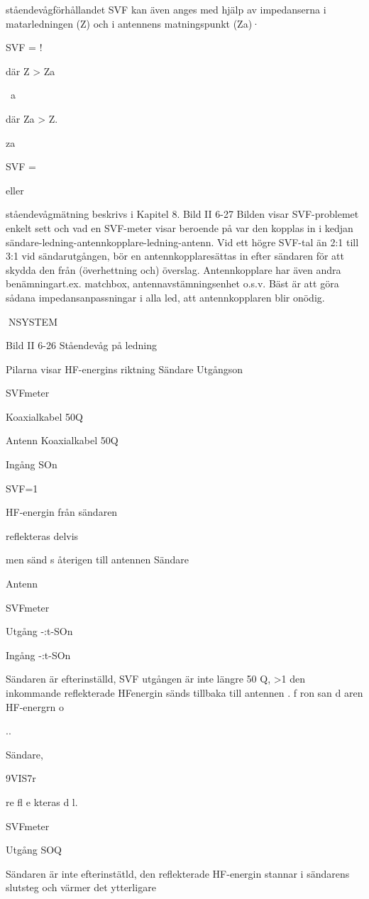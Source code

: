 {{ståendevågförhållandet SVF kan även
anges med hjälp av impedanserna i matarledningen (Z) och i antennens matningspunkt (Za)·

SVF = !

där Z > Za

~a

där Za > Z.

za

SVF =

eller

ståendevågmätning beskrivs i Kapitel 8.
Bild II 6-27
Bilden visar SVF-problemet enkelt sett
och vad en SVF-meter visar beroende på
var den kopplas in i kedjan sändare-ledning-antennkopplare-ledning-antenn.
Vid ett högre SVF-tal än 2:1 till 3:1 vid
sändarutgången, bör en antennkopplaresättas in efter sändaren för att skydda den från
(överhettning och) överslag. Antennkopplare har även andra benämningart.ex. matchbox, antennavstämningsenhet o.s.v. Bäst
är att göra sådana impedansanpassningar i
alla led, att antennkopplaren blir onödig.

NSYSTEM

Bild II 6-26 Ståendevåg på ledning

Pilarna visar HF-energins riktning
Sändare
Utgångson

SVFmeter

Koaxialkabel 50Q

Antenn
Koaxialkabel 50Q

Ingång SOn

SVF=1

HF-energin från sändaren

reflekteras delvis

men sänd s återigen till antennen
Sändare

Antenn

SVFmeter

Utgång
-:t-SOn

Ingång
-:t-SOn

Sändaren är efterinställd,
SVF
utgången är inte längre 50 Q,
>1
den inkommande reflekterade HFenergin sänds tillbaka till antennen
. f ron san d aren
HF-energrn
o

..

Sändare,\

9VIS7r

re fl e kteras d l.

SVFmeter

Utgång SOQ

Sändaren är inte efterinstätld,
den reflekterade HF-energin
stannar i sändarens slutsteg
och värmer det ytterligare

}}
